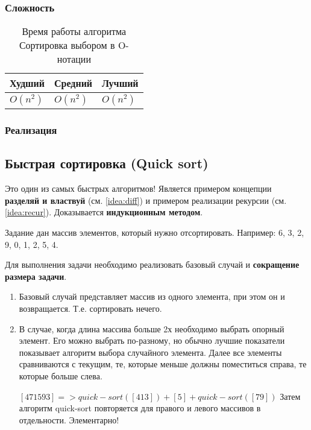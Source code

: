 \subsubsection{Сложность}

\begin{table}[h!]
\caption{Время работы алгоритма Сортировка выбором в O-нотации}
\begin{tabular}{|l|l|l|}
\hline
Худший & Средний & Лучший \\ \hline
$ O(n^{2}) $ & $ O(n^{2}) $ & $ O(n^{2}) $ \\\hline
\end{tabular}
\end{table}

\subsubsection{Реализация}

\linenumbers
{}
\nolinenumbers	

\subsection{Быстрая сортировка (Quick sort) \label{sort:quick}}
Это один из самых быстрых алгоритмов! Является примером концепции \textbf{разделяй и властвуй} (см. \ref{idea:diff}) и примером реализации рекурсии (см. \ref{idea:recur}). Доказывается \textbf{индукционным методом}.

Задание дан массив элементов, который нужно отсортировать. Например: 6, 3, 2, 9, 0, 1, 2, 5, 4.

Для выполнения задачи необходимо реализовать базовый случай и \textbf{сокращение размера задачи}. 
\begin{enumerate}
\item Базовый случай представляет массив из одного элемента, при этом он и возвращается. Т.е. сортировать нечего.
\item В случае, когда длина массива больше 2х необходимо выбрать опорный элемент. Его можно выбрать по-разному, но обычно лучшие показатели показывает алгоритм выбора случайного элемента. Далее все элементы сравниваются с текущим, те, которые меньше должны поместиться справа, те которые больше слева.

$ [4 7 1 5 9 3] => quick-sort([4 1 3]) + [5] + quick-sort([7 9]) $
Затем алгоритм quick-sort повторяется для правого и левого массивов в отдельности. Элементарно!
\end{enumerate}

